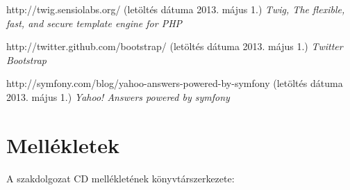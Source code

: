 \documentclass[a4paper,12pt,oneside]{report}
\begin{document}
\begin{thebibliography}{99}
        http://twig.sensiolabs.org/
        (letöltés dátuma 2013. május 1.)
        {\em Twig, The flexible, fast, and secure template engine for PHP}

        http://twitter.github.com/bootstrap/
        (letöltés dátuma 2013. május 1.)
        {\em Twitter Bootstrap}

        http://symfony.com/blog/yahoo-answers-powered-by-symfony
        (letöltés dátuma 2013. május 1.)
        {\em Yahoo! Answers powered by symfony}

\end{thebibliography}

\section{Mellékletek}

A szakdolgozat CD mellékletének könyvtárszerkezete:
\end{document}
